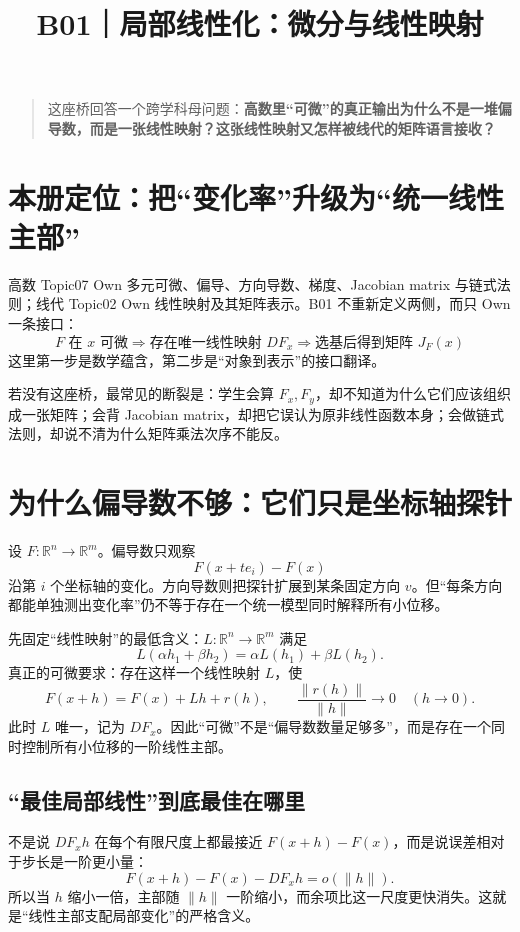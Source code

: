 \documentclass[profile=standard]{ipara-handbook}
\title{B01｜局部线性化：微分与线性映射}
\author{}
\date{}
\begin{document}
\maketitle

\begin{quote}
这座桥回答一个跨学科母问题：\textbf{高数里“可微”的真正输出为什么不是一堆偏导数，而是一张线性映射？这张线性映射又怎样被线代的矩阵语言接收？}
\end{quote}

\section{本册定位：把“变化率”升级为“统一线性主部”}
高数 Topic07 Own 多元可微、偏导、方向导数、梯度、Jacobian matrix 与链式法则；线代 Topic02 Own 线性映射及其矩阵表示。B01 不重新定义两侧，而只 Own 一条接口：
\[
\boxed{
F\text{ 在 }x\text{ 可微}
\Longrightarrow
\text{存在唯一线性映射 }DF_x
\Longrightarrow
\text{选基后得到矩阵 }J_F(x)
}
\]
这里第一步是数学蕴含，第二步是“对象到表示”的接口翻译。

若没有这座桥，最常见的断裂是：学生会算 $F_x,F_y$，却不知道为什么它们应该组织成一张矩阵；会背 Jacobian matrix，却把它误认为原非线性函数本身；会做链式法则，却说不清为什么矩阵乘法次序不能反。

\section{为什么偏导数不够：它们只是坐标轴探针}
设 $F:\mathbb R^n\to\mathbb R^m$。偏导数只观察
\[
F(x+t e_i)-F(x)
\]
沿第 $i$ 个坐标轴的变化。方向导数则把探针扩展到某条固定方向 $v$。但“每条方向都能单独测出变化率”仍不等于存在一个统一模型同时解释所有小位移。

先固定“线性映射”的最低含义：$L:\mathbb R^n\to\mathbb R^m$ 满足
\[
L(\alpha h_1+\beta h_2)=\alpha L(h_1)+\beta L(h_2).
\]
真正的可微要求：存在这样一个线性映射 $L$，使
\[
F(x+h)=F(x)+Lh+r(h),
\qquad
\frac{\lVert r(h)\rVert}{\lVert h\rVert}\to0\quad(h\to0).
\]
此时 $L$ 唯一，记为 $DF_x$。因此“可微”不是“偏导数数量足够多”，而是存在一个同时控制所有小位移的一阶线性主部。

\subsection{“最佳局部线性”到底最佳在哪里}
不是说 $DF_xh$ 在每个有限尺度上都最接近 $F(x+h)-F(x)$，而是说误差相对于步长是一阶更小量：
\[
F(x+h)-F(x)-DF_xh=o(\lVert h\rVert).
\]
所以当 $h$ 缩小一倍，主部随 $\lVert h\rVert$ 一阶缩小，而余项比这一尺度更快消失。这就是“线性主部支配局部变化”的严格含义。
\end{document}
